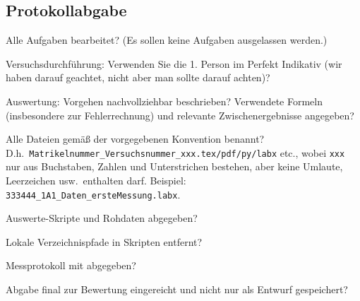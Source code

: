 \documentclass[twoside]{protokoll}
\begin{document}
\subsection*{Protokollabgabe}
\begin{checklist}
\item Alle Aufgaben bearbeitet? (Es sollen keine Aufgaben ausgelassen
  werden.)
\item Versuchsdurchführung: Verwenden Sie die 1. Person im Perfekt
  Indikativ (\glqq{}wir haben darauf geachtet\grqq{}, nicht aber
  \glqq{}man sollte darauf achten\grqq{})?
\item Auswertung: Vorgehen nachvollziehbar beschrieben? Verwendete
  Formeln (insbesondere zur Fehlerrechnung) und relevante
  Zwischenergebnisse angegeben?
\item Alle Dateien gemäß der vorgegebenen Konvention benannt?\newline
  D.h.~\texttt{Matrikelnummer\_Versuchsnummer\_xxx.tex/pdf/py/labx}
  etc., wobei \texttt{xxx} nur aus Buchstaben, Zahlen und
  Unterstrichen bestehen, aber keine Umlaute, Leerzeichen
  usw.~enthalten darf.\newline
  Beispiel: \texttt{333444\_1A1\_Daten\_ersteMessung.labx}.
\item Auswerte-Skripte und Rohdaten abgegeben?
\item Lokale Verzeichnispfade in Skripten entfernt?
\item Messprotokoll mit abgegeben?
\item Abgabe final zur Bewertung eingereicht und nicht nur als Entwurf
  gespeichert?
\end{checklist}

% 
%
\end{document}
